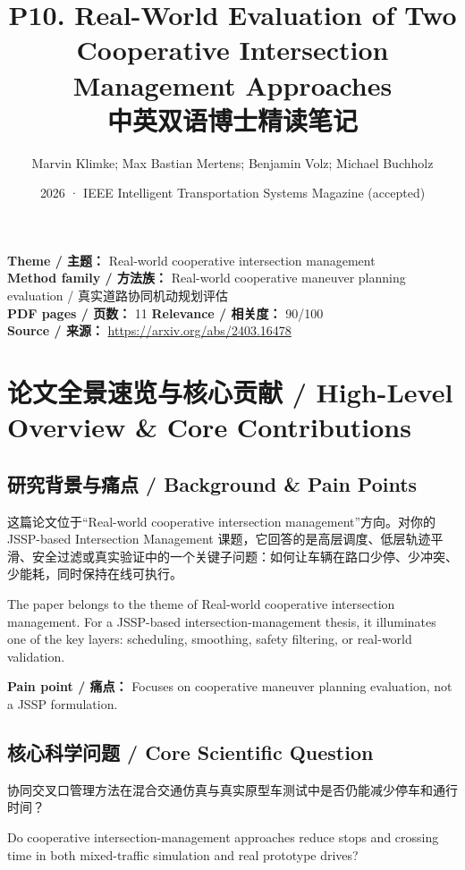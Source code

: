 \documentclass[UTF8,a4paper,11pt,fontset=fandol]{ctexart}
\title{P10. Real-World Evaluation of Two Cooperative Intersection Management Approaches\\中英双语博士精读笔记}
\author{Marvin Klimke; Max Bastian Mertens; Benjamin Volz; Michael Buchholz}
\date{2026 · IEEE Intelligent Transportation Systems Magazine (accepted)}
\begin{document}
\maketitle

\noindent\textbf{Theme / 主题：} Real-world cooperative intersection management\\
\textbf{Method family / 方法族：} Real-world cooperative maneuver planning evaluation / 真实道路协同机动规划评估\\
\textbf{PDF pages / 页数：} 11 \quad
\textbf{Relevance / 相关度：} 90/100\\
\textbf{Source / 来源：} \url{https://arxiv.org/abs/2403.16478}

\section{论文全景速览与核心贡献 / High-Level Overview \& Core Contributions}
\subsection{研究背景与痛点 / Background \& Pain Points}
这篇论文位于“Real-world cooperative intersection management”方向。对你的 JSSP-based Intersection Management 课题，它回答的是高层调度、低层轨迹平滑、安全过滤或真实验证中的一个关键子问题：如何让车辆在路口少停、少冲突、少能耗，同时保持在线可执行。

The paper belongs to the theme of Real-world cooperative intersection management. For a JSSP-based intersection-management thesis, it illuminates one of the key layers: scheduling, smoothing, safety filtering, or real-world validation.

\textbf{Pain point / 痛点：} Focuses on cooperative maneuver planning evaluation, not a JSSP formulation.

\subsection{核心科学问题 / Core Scientific Question}
协同交叉口管理方法在混合交通仿真与真实原型车测试中是否仍能减少停车和通行时间？

Do cooperative intersection-management approaches reduce stops and crossing time in both mixed-traffic simulation and real prototype drives?
\end{document}
